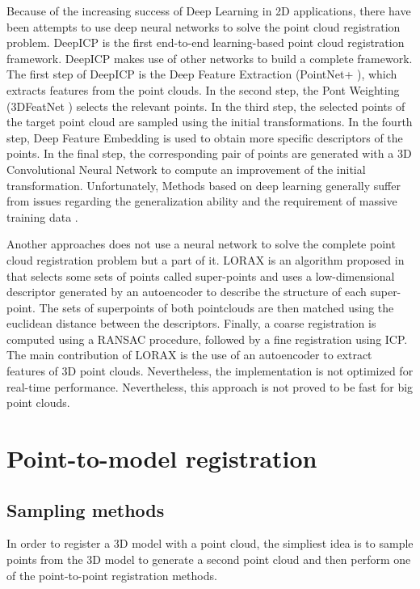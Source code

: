         Because of the increasing success of Deep Learning in 2D applications, there have been attempts to use deep neural networks
        to solve the point cloud registration problem.
        DeepICP \cite{Lu_2019_deepicp} is the first end-to-end learning-based point cloud registration framework.
        DeepICP makes use of other networks to build a complete framework.
        The first step of DeepICP is the Deep Feature Extraction (PointNet+ \cite{Qi_2017_pointnet}), which extracts features from the point clouds.
        In the second step, the Pont Weighting (3DFeatNet \cite{Yew_2018_3dfeat}) selects the relevant points.
        In the third step, the selected points of the target point cloud are sampled using the initial transformations.
        In the fourth step, Deep Feature Embedding is used to obtain more specific descriptors of the points.
        In the final step, the corresponding pair of points are generated with a 3D Convolutional Neural Network
        to compute an improvement of the initial transformation.
        Unfortunately, Methods based on deep learning generally suffer from issues regarding the generalization ability and 
        the requirement of massive training data \cite{Quan_2020_com}.

        Another approaches does not use a neural network to solve the complete point cloud registration problem but a part of it.
        LORAX is an algorithm proposed in \cite{Elbaz_2017_3dpoint} that selects some sets of points called super-points and uses a low-dimensional descriptor 
        generated by an autoencoder to describe the structure of each super-point.
        The sets of superpoints of both pointclouds are then matched using the euclidean distance between the descriptors.
        Finally, a coarse registration is computed using a RANSAC procedure, followed by a fine registration using ICP.
        The main contribution of LORAX is the use of an autoencoder to extract features of 3D point clouds. 
        Nevertheless, the implementation is not optimized for real-time performance. Nevertheless, this approach is not 
        proved to be fast for big point clouds.

    \section{Point-to-model registration}

        \subsection{Sampling methods}
        In order to register a 3D model with a point cloud, the simpliest idea is to sample points from the 3D model to generate a second point cloud
        and then perform one of the point-to-point registration methods. 

